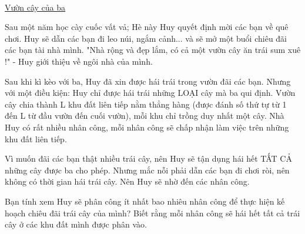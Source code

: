  

\href{https://www.youtube.com/watch?v=WBJMeGgAmY8}{Vườn cây của ba }

Sau một năm học cày cuốc vất vả; Hè này Huy quyết định mời các bạn về quê chơi. Huy sẽ dẫn các bạn đi leo núi, ngắm cảnh... và sẽ mở một buổi chiêu đãi các bạn tài nhà mình. "Nhà rộng và đẹp lắm, có cả một vườn cây ăn trái sum xuê !" - Huy giới thiệu về ngôi nhà của mình.

Sau khi kì kèo với ba, Huy đã xin được hái trái trong vườn đãi các bạn. Nhưng với một điều kiện: Huy chỉ được hái trái những LOẠI cây mà ba qui định. Vườn cây chia thành L khu đất liên tiếp nằm thẳng hàng (được đánh số thứ tự từ 1 đến L từ đầu vườn đến cuối vườn), mỗi khu chỉ trồng duy nhất một cây. Nhà Huy có rất nhiều nhân công, mỗi nhân công sẽ chấp nhận làm việc trên những khu đất liên tiếp.

Vì muốn đãi các bạn thật nhiều trái cây, nên Huy sẽ tận dụng hái hết TẤT CẢ những cây được ba cho phép. Nhưng mắc nỗi phải dẫn các bạn đi chơi ròi, nên không có thời gian hái trái cây. Nên Huy sẽ nhờ đến các nhân công.

Bạn tính xem Huy sẽ phân công ít nhất bao nhiêu nhân công để thực hiện kế hoạch chiêu đãi trái cây của mình? Biết rằng mỗi nhân công sẽ hái hết tất cả trái cây ở các khu đất mình được phân vào.